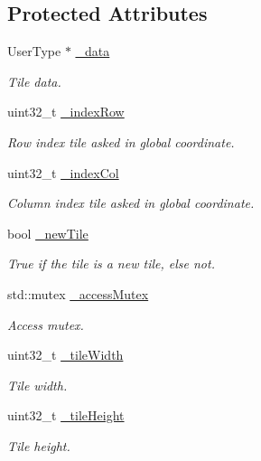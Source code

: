 \subsection*{Protected Attributes}
\begin{DoxyCompactItemize}
\item 
User\+Type $\ast$ \hyperlink{classfi_1_1CachedTile_a47bd4b69660f58f993b7ff336dc5f188}{\+\_\+data}
\begin{DoxyCompactList}\small\item\em Tile data. \end{DoxyCompactList}\item 
uint32\+\_\+t \hyperlink{classfi_1_1CachedTile_aab0a9c9723c4d318e71e9b8e2fe80e92}{\+\_\+index\+Row}
\begin{DoxyCompactList}\small\item\em Row index tile asked in global coordinate. \end{DoxyCompactList}\item 
uint32\+\_\+t \hyperlink{classfi_1_1CachedTile_aa5ba6ea184ad614c488023a3c3e04963}{\+\_\+index\+Col}
\begin{DoxyCompactList}\small\item\em Column index tile asked in global coordinate. \end{DoxyCompactList}\item 
bool \hyperlink{classfi_1_1CachedTile_ad17f4d3676869cec36d4d03a0c865c1e}{\+\_\+new\+Tile}
\begin{DoxyCompactList}\small\item\em True if the tile is a new tile, else not. \end{DoxyCompactList}\item 
std\+::mutex \hyperlink{classfi_1_1CachedTile_a4e45c4300e3d593dbc5f7ab7f23354a1}{\+\_\+access\+Mutex}
\begin{DoxyCompactList}\small\item\em Access mutex. \end{DoxyCompactList}\item 
uint32\+\_\+t \hyperlink{classfi_1_1CachedTile_af77038cc15872076b1d02323ca6f2353}{\+\_\+tile\+Width}
\begin{DoxyCompactList}\small\item\em Tile width. \end{DoxyCompactList}\item 
uint32\+\_\+t \hyperlink{classfi_1_1CachedTile_aed23a0a9cf8b01a84bc55835b9ffc102}{\+\_\+tile\+Height}
\begin{DoxyCompactList}\small\item\em Tile height. \end{DoxyCompactList}\end{DoxyCompactItemize}
